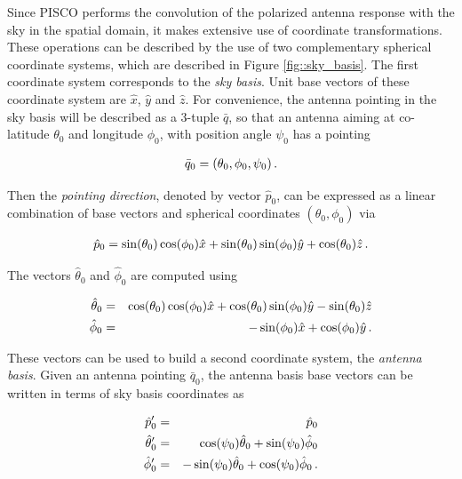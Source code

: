 \documentclass[a4paper,11pt]{article}
\begin{document}
Since PISCO performs the convolution of the polarized antenna response with the sky in the spatial domain, it makes extensive use of coordinate transformations. These operations can be described by the use of two complementary spherical coordinate systems, which are described in Figure \ref{fig::sky_basis}. The first coordinate system corresponds to the \textsl{sky basis}. Unit base vectors of these coordinate system are $\hat{x}$, $\hat{y}$ and $\hat{z}$. For convenience, the antenna pointing in the sky basis will be described as a 3-tuple $\bar{q}$, so that an antenna aiming at co-latitude $\theta_0$ and longitude $\phi_0$, with position angle $\psi_0$ has a pointing 

\begin{equation}
\begin{aligned}
\bar{q}_0= (\theta_0,\phi_0,\psi_0) \, \rm{.}
\end{aligned}
\end{equation}

Then the \textsl{pointing direction}, denoted by vector $\hat{p}_0$, can be expressed as a linear combination of base vectors and spherical coordinates $(\theta_0,\phi_0)$ via

\begin{equation}
\begin{aligned}
\hat{p}_0 = \sin(\theta_0)\cos(\phi_0) \hat{x} + \sin(\theta_0)\sin(\phi_0) \hat{y} + \cos(\theta_0) \hat{z} \, \rm{.}
\end{aligned}
\label{eq::p_sky_basis}
\end{equation}

The vectors $\hat{\theta}_0$ and $\hat{\phi}_0$ are computed using

\begin{eqnarray}
\begin{aligned}
\hat{\theta}_0 &=&  \cos(\theta_0) \cos(\phi_0) \hat{x} + \cos(\theta_0)\sin(\phi_0) \hat{y} - \sin(\theta_0) \hat{z} \\
\hat{\phi}_0   &=&              -\sin(\phi_0) \hat{x} +             \cos(\phi_0) \hat{y} \, \rm{.}
\end{aligned}
\label{eq::tangent_sky_basis}
\end{eqnarray}

These vectors can be used to build a second coordinate system, the \textsl{antenna basis}. Given an antenna pointing $\bar{q}_0$, the antenna basis base vectors can be written in terms of sky basis coordinates as 

\begin{eqnarray}
\hat{p}'_0      &=&  \hat{p}_0 \\
\hat{\theta}'_0 &=&  \cos(\psi_0)\hat{\theta}_0 + \sin(\psi_0)\hat{\phi}_0 \\
\hat{\phi}'_0   &=& -\sin(\psi_0)\hat{\theta}_0 + \cos(\psi_0)\hat{\phi}_0 \, \rm{.}
\label{eq::antenna_base_vectors}
\end{eqnarray}
\end{document}
